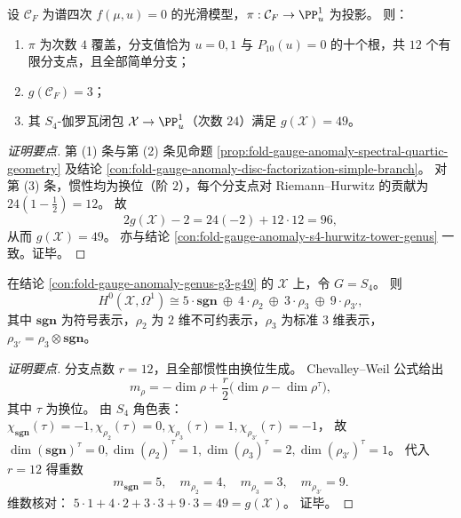\begin{conclusion}\label{con:fold-gauge-anomaly-genus-g3-g49}
设 \(\mathcal C_F\) 为谱四次 \(f(\mu,u)=0\) 的光滑模型，\(\pi:\mathcal C_F\to\PP^1_u\) 为投影。
则：
\begin{enumerate}
  \item \(\pi\) 为次数 \(4\) 覆盖，分支值恰为 \(u=0,1\) 与 \(P_{10}(u)=0\) 的十个根，共 \(12\) 个有限分支点，且全部简单分支；
  \item \(g(\mathcal C_F)=3\)；
  \item 其 \(S_4\)-伽罗瓦闭包 \(\mathcal X\to\PP^1_u\)（次数 \(24\)）满足 \(g(\mathcal X)=49\)。
\end{enumerate}
\end{conclusion}
\begin{proof}[证明要点]
第 (1) 条与第 (2) 条见命题 \ref{prop:fold-gauge-anomaly-spectral-quartic-geometry} 及结论 \ref{con:fold-gauge-anomaly-disc-factorization-simple-branch}。
对第 (3) 条，惯性均为换位（阶 \(2\)），每个分支点对 Riemann--Hurwitz 的贡献为 \(24(1-\tfrac12)=12\)。
故
\[
2g(\mathcal X)-2=24(-2)+12\cdot 12=96,
\]
从而 \(g(\mathcal X)=49\)。
亦与结论 \ref{con:fold-gauge-anomaly-s4-hurwitz-tower-genus} 一致。证毕。
\end{proof}

\begin{conclusion}\label{con:fold-gauge-anomaly-chevalley-weil-s4}
在结论 \ref{con:fold-gauge-anomaly-genus-g3-g49} 的 \(\mathcal X\) 上，令 \(G=S_4\)。
则
\[
H^0(\mathcal X,\Omega^1)\cong
5\cdot \mathbf{sgn}\ \oplus\ 4\cdot \rho_{2}\ \oplus\ 3\cdot \rho_{3}\ \oplus\ 9\cdot \rho_{3'},
\]
其中 \(\mathbf{sgn}\) 为符号表示，\(\rho_2\) 为 \(2\) 维不可约表示，\(\rho_3\) 为标准 \(3\) 维表示，\(\rho_{3'}=\rho_3\otimes\mathbf{sgn}\)。
\end{conclusion}
\begin{proof}[证明要点]
分支点数 \(r=12\)，且全部惯性由换位生成。
Chevalley--Weil 公式给出
\[
m_\rho=-\dim\rho+\frac r2\bigl(\dim\rho-\dim\rho^\tau\bigr),
\]
其中 \(\tau\) 为换位。
由 \(S_4\) 角色表：
\(
\chi_{\mathbf{sgn}}(\tau)=-1,\chi_{\rho_2}(\tau)=0,\chi_{\rho_3}(\tau)=1,\chi_{\rho_{3'}}(\tau)=-1
\)，
故
\(
\dim(\mathbf{sgn})^\tau=0,\dim(\rho_2)^\tau=1,\dim(\rho_3)^\tau=2,\dim(\rho_{3'})^\tau=1
\)。
代入 \(r=12\) 得重数
\[
m_{\mathbf{sgn}}=5,\quad m_{\rho_2}=4,\quad m_{\rho_3}=3,\quad m_{\rho_{3'}}=9.
\]
维数核对：
\(
5\cdot1+4\cdot2+3\cdot3+9\cdot3=49=g(\mathcal X)
\)。
证毕。
\end{proof}

